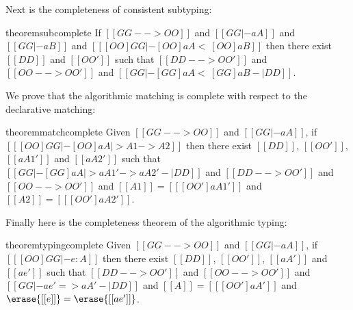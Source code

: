 Next is the completeness of consistent subtyping:

\begin{restatable}{theorem}{subcomplete} \label{thm:sub_completeness}
  If $[[ GG --> OO  ]]$ and $[[ GG |- aA  ]]$ and $[[ GG |- aB  ]]$ and $[[  [OO]GG |- [OO]aA <~ [OO]aB  ]]$ then
  there exist $[[DD]]$ and $[[OO']]$ such that $[[DD --> OO']]$ and $[[OO --> OO']]$ and $[[  GG |- [GG]aA <~ [GG]aB -| DD ]]$.
\end{restatable}

We prove that the algorithmic matching is complete with respect to the
declarative matching:


\begin{restatable}{theorem}{matchcomplete} \label{thm:match_complete}%
  Given $[[ GG --> OO  ]]$ and $[[ GG |- aA  ]]$, if
  $[[ [OO]GG |- [OO]aA |> A1 -> A2  ]]$
  then there exist $[[DD]]$, $[[OO']]$, $[[aA1']]$ and $[[aA2']]$ such that $[[ GG |- [GG]aA |> aA1' -> aA2' -| DD   ]]$
  and $[[ DD --> OO'  ]]$ and $[[ OO --> OO'  ]]$ and $[[A1]] = [[ [OO']aA1'  ]]$ and $[[A2]] = [[ [OO']aA2'  ]]$.
\end{restatable}


Finally here is the completeness theorem of the algorithmic typing:

\begin{restatable}{theorem}{typingcomplete}
  \label{thm:type_complete}
  Given $[[GG --> OO]]$ and $[[GG |- aA]]$, if $[[ [OO]GG |- e : A ]]$ then there exist $[[DD]]$, $[[OO']]$, $[[aA']]$ and $[[ae']]$
  such that $[[DD --> OO']]$ and $[[OO --> OO']]$ and $[[  GG |- ae' => aA' -| DD  ]]$ and $[[A]] = [[ [OO']aA'  ]]$ and $\erase{[[e]]} = \erase{[[ae']]}$.
\end{restatable}



